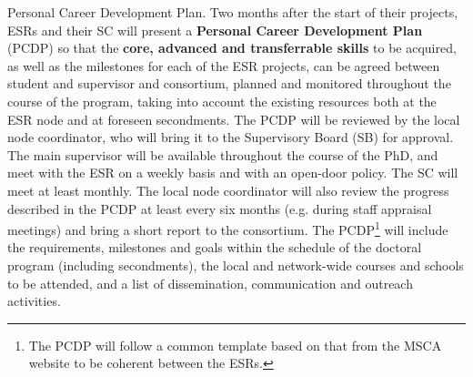 \noindent \color{blue}Personal Career Development Plan. \color{black}
Two months after the start of their projects, ESRs and their SC will present a \textbf{Personal Career Development Plan} (PCDP) so that the \textbf{core, advanced and transferrable skills} to be acquired, as well as the milestones for each of the ESR projects, can be agreed between student and supervisor and consortium, planned and monitored throughout the course of the program, taking into account the existing resources both at the ESR node and at foreseen secondments. The PCDP will be reviewed by the local node coordinator, who will bring it to the Supervisory Board (SB) for approval. The main supervisor will be available throughout the course of the PhD, and meet with the ESR on a weekly basis and with an open-door policy. The SC will meet at least monthly.
The local node coordinator will also review the progress described in the PCDP at least every six months (e.g. during staff appraisal meetings) and bring a short report to the consortium. 
The PCDP\footnote{The \acronym PCDP will follow a common template based on that from the MSCA website to be coherent between the ESRs.} will include the requirements, milestones and goals within the schedule of the doctoral program (including secondments), the local and network-wide courses and schools to be attended, and a list of dissemination, communication and outreach activities. 



